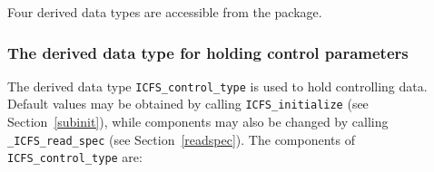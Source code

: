 \documentclass{galahad}
\newcommand{\packagename}{ICFS}
\newcommand{\fullpackagename}{\libraryname\_\packagename}
\begin{document}

\galtypes
Four derived data types are accessible from the package.


\subsubsection{The derived data type for holding control 
 parameters}\label{typecontrol}
The derived data type 
{\tt \packagename\_control\_type} 
is used to hold controlling data. Default values may be obtained by calling 
{\tt \packagename\_initialize}
(see Section~\ref{subinit}),
while components may also be changed by calling 
{\tt \fullpackagename\_read\-\_spec}
(see Section~\ref{readspec}). 
The components of 
{\tt \packagename\_control\_type} 
are:
\end{document}
